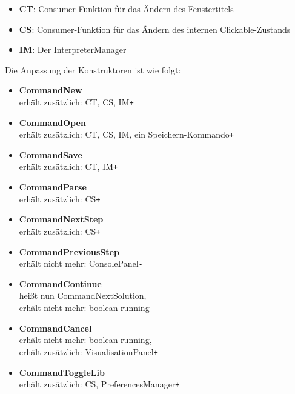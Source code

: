 \documentclass[parskip=full,11pt,twoside]{scrartcl}
\begin{document}
\begin{itemize}
	\item \textbf{CT}: Consumer-Funktion für das Ändern des Fenstertitels
	\item \textbf{CS}: Consumer-Funktion für das Ändern des internen Clickable-Zustands
	\item \textbf{IM}: Der InterpreterManager
\end{itemize}

Die Anpassung der Konstruktoren ist wie folgt:
\begin{itemize}
	\item \textbf{CommandNew}\\\hspace*{1cm}erhält zusätzlich: CT, CS, IM\hfill \texttt{+}
	\item \textbf{CommandOpen}\\\hspace*{1cm}erhält zusätzlich: CT, CS, IM, ein Speichern-Kommando\hfill\texttt{+}
	\item \textbf{CommandSave}\\\hspace*{1cm}erhält zusätzlich: CT, IM\hfill\texttt{+}
	\item \textbf{CommandParse}\\\hspace*{1cm}erhält zusätzlich: CS\hfill\texttt{+}
	\item \textbf{CommandNextStep}\\\hspace*{1cm}erhält zusätzlich: CS\hfill\texttt{+}
	\item \textbf{CommandPreviousStep}\\\hspace*{1cm}erhält nicht mehr: ConsolePanel\hfill\texttt{-}
	\item \textbf{CommandContinue}\\\hspace*{1cm}heißt nun CommandNextSolution,
								  \\\hspace*{1cm}erhält nicht mehr: boolean running\hfill\texttt{-}
	\item \textbf{CommandCancel}\\\hspace*{1cm}erhält nicht mehr: boolean running,\hfill\texttt{-}
								\\\hspace*{1cm}erhält zusätzlich: VisualisationPanel\hfill\texttt{+}
	\item \textbf{CommandToggleLib}\\\hspace*{1cm}erhält zusätzlich: CS, PreferencesManager\hfill\texttt{+}

\end{itemize}
\end{document}
